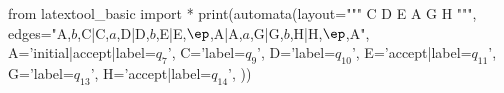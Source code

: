 from latextool_basic import *
print(automata(layout="""
      C  D  E
   A 
      G  H
""",
edges="A,$b$,C|C,$a$,D|D,$b$,E|E,$\ep$,A|A,$a$,G|G,$b$,H|H,$\ep$,A",
A='initial|accept|label=$q_7$',
C='label=$q_9$',
D='label=$q_{10}$',
E='accept|label=$q_{11}$',
G='label=$q_{13}$',
H='accept|label=$q_{14}$',
))
